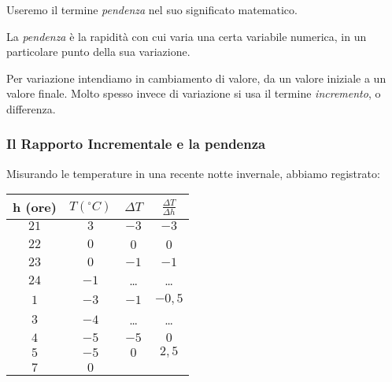 Useremo il termine \emph{pendenza} nel suo significato matematico.
\begin{definizione}
La \emph{pendenza} è la rapidità con cui varia una certa variabile
numerica, in un particolare punto della sua variazione. 
\end{definizione}

Per variazione intendiamo in cambiamento di valore, da un valore iniziale a un 
valore finale. Molto spesso invece di variazione si usa il termine 
\emph{incremento}, o differenza.

\subsubsection{Il Rapporto Incrementale e la pendenza}
\label{subsubsec:RI}
\begin{esempio}
Misurando le temperature in una recente notte invernale, abbiamo registrato:

 \begin{minipage}{0.48\textwidth}
 \begin{center}
\begin{tabular}{cccc}\toprule
h (ore) & \(T (^\circ C)\) & \(\Delta T\) 
             & \(\frac{\Delta T}{\Delta h}\)\\\midrule
\(21\) & \(3\) & \(-3\) &\(-3\) \\
\(22\) & \(0\) & 0 & 0 \\
\(23\) & \(0\) & \(-1\) & \(-1\) \\
\(24\) & \(-1\) &\dots & \dots\\
\(1\)  & \(-3\) & \(-1\) &\(-0,5\)\\
\(3\)  & \(-4\) &\dots & \dots\\
\(4\)  & \(-5\) & \(-5\)  &\(0\)\\
\(5\)  & \(-5\) & \(0\) & \(2,5\)\\
\(7\)  & \(0\)  &
\\ \bottomrule
\end{tabular}
\label{tab:temperaturea}
\end{center}
\end{minipage}
 \hfill
\begin{minipage}{.48 \textwidth}
\begin{inaccessibleblock}
\begin{center} \scalebox{1}{\temperaturea} \end{center}
\end{inaccessibleblock}
\label{graf:temperaturea}
\end{minipage}


\end{esempio}
